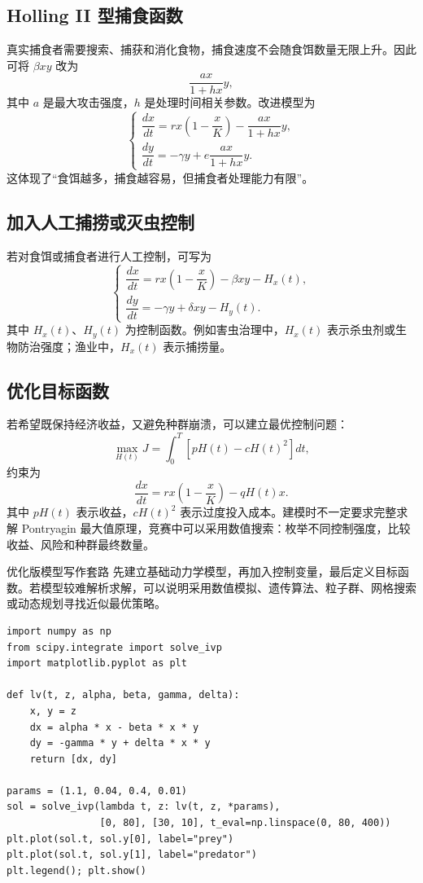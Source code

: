\documentclass[11pt,a4paper]{ctexart}
\begin{document}
\subsection{Holling II 型捕食函数}
真实捕食者需要搜索、捕获和消化食物，捕食速度不会随食饵数量无限上升。因此可将 $\beta xy$ 改为
\[
\frac{a x}{1+h x}y,
\]
其中 $a$ 是最大攻击强度，$h$ 是处理时间相关参数。改进模型为
\[
\begin{cases}
\dfrac{dx}{dt}=rx\left(1-\dfrac{x}{K}\right)-\dfrac{a x}{1+h x}y,\\[0.6em]
\dfrac{dy}{dt}=-\gamma y+e\dfrac{a x}{1+h x}y.
\end{cases}
\]
这体现了“食饵越多，捕食越容易，但捕食者处理能力有限”。

\subsection{加入人工捕捞或灭虫控制}
若对食饵或捕食者进行人工控制，可写为
\[
\begin{cases}
\dfrac{dx}{dt}=rx\left(1-\dfrac{x}{K}\right)-\beta xy-H_x(t),\\[0.5em]
\dfrac{dy}{dt}=-\gamma y+\delta xy-H_y(t).
\end{cases}
\]
其中 $H_x(t)$、$H_y(t)$ 为控制函数。例如害虫治理中，$H_x(t)$ 表示杀虫剂或生物防治强度；渔业中，$H_x(t)$ 表示捕捞量。

\subsection{优化目标函数}
若希望既保持经济收益，又避免种群崩溃，可以建立最优控制问题：
\[
\max_{H(t)} J=\int_0^T \left[pH(t)-cH(t)^2\right]dt,
\]
约束为
\[
\frac{dx}{dt}=rx\left(1-\frac{x}{K}\right)-qH(t)x.
\]
其中 $pH(t)$ 表示收益，$cH(t)^2$ 表示过度投入成本。建模时不一定要求完整求解 Pontryagin 最大值原理，竞赛中可以采用数值搜索：枚举不同控制强度，比较收益、风险和种群最终数量。

\begin{casebox}{优化版模型写作套路}
先建立基础动力学模型，再加入控制变量，最后定义目标函数。若模型较难解析求解，可以说明采用数值模拟、遗传算法、粒子群、网格搜索或动态规划寻找近似最优策略。
\end{casebox}

\begin{lstlisting}[style=pythonstyle,caption={用 solve\_ivp 求解食饵--捕食者模型}]
import numpy as np
from scipy.integrate import solve_ivp
import matplotlib.pyplot as plt

def lv(t, z, alpha, beta, gamma, delta):
    x, y = z
    dx = alpha * x - beta * x * y
    dy = -gamma * y + delta * x * y
    return [dx, dy]

params = (1.1, 0.04, 0.4, 0.01)
sol = solve_ivp(lambda t, z: lv(t, z, *params),
                [0, 80], [30, 10], t_eval=np.linspace(0, 80, 400))
plt.plot(sol.t, sol.y[0], label="prey")
plt.plot(sol.t, sol.y[1], label="predator")
plt.legend(); plt.show()
\end{lstlisting}
\end{document}
